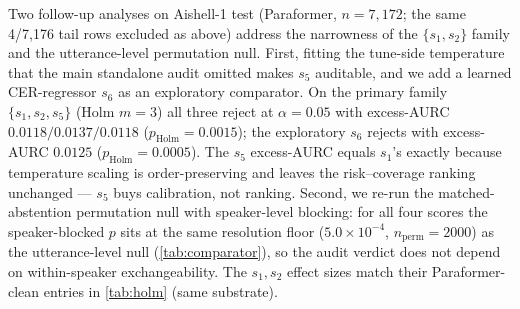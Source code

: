 \documentclass[11pt]{article}
\begin{document}
Two follow-up analyses on Aishell-1 test (Paraformer, $n=7{,}172$; the same 4/7{,}176 tail
rows excluded as above) address the narrowness of the $\{s_1,s_2\}$ family and the
utterance-level permutation null. First, fitting the tune-side temperature that the main
standalone audit omitted makes $s_5$ auditable, and we add a learned CER-regressor $s_6$ as
an exploratory comparator. On the primary family $\{s_1,s_2,s_5\}$ (Holm $m=3$) all three
reject at $\alpha=0.05$ with excess-AURC $0.0118/0.0137/0.0118$ ($p_{\mathrm{Holm}}=0.0015$);
the exploratory $s_6$ rejects with excess-AURC $0.0125$ ($p_{\mathrm{Holm}}=0.0005$). The
$s_5$ excess-AURC equals $s_1$'s exactly because temperature scaling is order-preserving and
leaves the risk--coverage ranking unchanged --- $s_5$ buys calibration, not ranking. Second,
we re-run the matched-abstention permutation null with speaker-level blocking: for all four
scores the speaker-blocked $p$ sits at the same resolution floor ($5.0\times10^{-4}$,
$n_{\mathrm{perm}}=2000$) as the utterance-level null (\cref{tab:comparator}), so the audit
verdict does not depend on within-speaker exchangeability. The $s_1,s_2$ effect sizes match
their Paraformer-clean entries in \cref{tab:holm} (same substrate).
\end{document}
